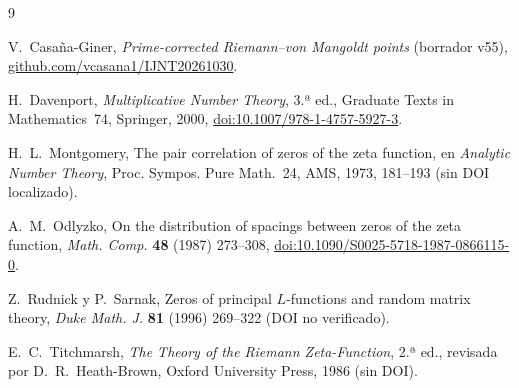 \documentclass[11pt,a4paper]{article}
\numberwithin{equation}{section}
\theoremstyle{definition}
\begin{document}
\begin{thebibliography}{9}

 V.~Casaña-Giner, \emph{Prime-corrected Riemann--von Mangoldt points} (borrador v55), \href{https://github.com/vcasana1/IJNT20261030}{github.com/vcasana1/IJNT20261030}.

 H.~Davenport, \emph{Multiplicative Number Theory}, 3.ª ed., Graduate Texts in Mathematics~74, Springer, 2000, \href{https://doi.org/10.1007/978-1-4757-5927-3}{doi:10.1007/978-1-4757-5927-3}.

 H.~L.~Montgomery, The pair correlation of zeros of the zeta function, en \emph{Analytic Number Theory}, Proc. Sympos. Pure Math.~24, AMS, 1973, 181--193 (sin DOI localizado).

 A.~M.~Odlyzko, On the distribution of spacings between zeros of the zeta function, \emph{Math. Comp.} \textbf{48} (1987) 273--308, \href{https://doi.org/10.1090/S0025-5718-1987-0866115-0}{doi:10.1090/S0025-5718-1987-0866115-0}.

 Z.~Rudnick y P.~Sarnak, Zeros of principal $L$-functions and random matrix theory, \emph{Duke Math. J.} \textbf{81} (1996) 269--322 (DOI no verificado).

 E.~C.~Titchmarsh, \emph{The Theory of the Riemann Zeta-Function}, 2.ª ed., revisada por D.~R.~Heath-Brown, Oxford University Press, 1986 (sin DOI).

\end{thebibliography}
\end{document}
